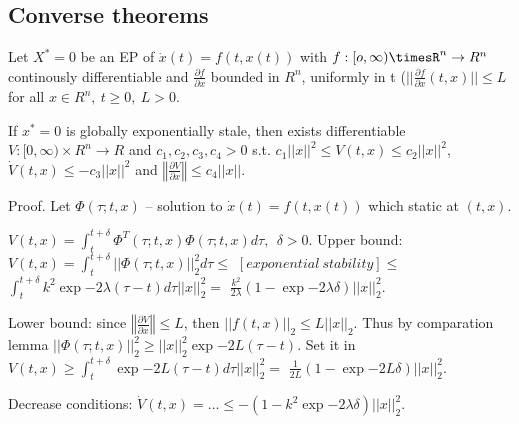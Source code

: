 \subsection{Converse theorems}

 Let $X^*=0$ be an EP of $\dot x(t)=f(t,x(t))$ with $f:[o,\infty)\timesR^n\to R^n$
 continously differentiable and $\frac{\partial f}{\partial x}$ bounded in $R^n$,
 uniformly in t ($||\frac{\partial f}{\partial x}(t,x)||\le L$ for all 
 $x\in R^n,\ t\ge 0,\ L>0$.

 If $x^*=0$ is globally exponentially stale, then exists differentiable 
 $V:[0,\infty)\times R^n\to R$ and $c_1,c_2,c_3,c_4>0$ s.t.
 $c_1||x||^2\le V(t,x)\le c_2||x||^2$, $\dot V(t,x)\le -c_3||x||^2$ and
 $\left\Vert \frac{\partial V}{\partial x}\right\Vert \le c_4||x||$.

Proof. Let $\Phi(\tau;t,x)$ -- solution to $\dot x(t)=f(t, x(t))$ which static
at $(t,x)$.

$V(t,x)=\int_t^{t+\delta}\Phi^T(\tau;t,x)\Phi(\tau;t,x) d\tau, \ \ \delta>0$.
Upper bound: $V(t,x)=\int_t^{t+\delta}||\Phi(\tau;t,x)||_2^2 d\tau\le$
$[exponential\ stability]\le$
$\int_t^{t+\delta}k^2\exp{-2\lambda(\tau-t)}d\tau ||x||_2^2 =$
$\frac{k^2}{2\lambda}(1-\exp{-2\lambda\delta})||x||_2^2$.

Lower bound: since $\left\Vert \frac{\partial V}{\partial x}\right\Vert \le L$, then
$||f(t,x)||_2\le L||x||_2$. Thus by comparation lemma 
$||\Phi(\tau;t,x)||_2^2\ge ||x||_2^2\exp{-2L(\tau-t)}$. Set it in 
$V(t,x)\ge \int_t^{t+\delta}\exp{-2L(\tau-t)} d\tau ||x||_2^2=$
$\frac{1}{2L}(1-\exp{-2L\delta})||x||_2^2$.

Decrease conditions: $\dot V(t,x)=\dots\le-(1-k^2\exp{-2\lambda\delta})||x||_2^2$.
